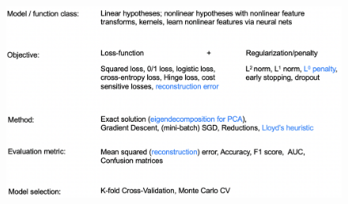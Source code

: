\documentclass[a4paper]{extarticle}
\begin{document}
\begin{figure}[H]
    \includegraphics[width=15cm]{../images/IntroML_Fig9-4}
    \centering
\end{figure}
\end{document}
